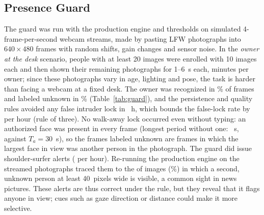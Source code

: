 \documentclass[journal]{IEEEtran}
\begin{document}
\subsection{Presence Guard}\label{sec:guardres}
The guard was run with the production engine and thresholds on simulated 4-frame-per-second webcam streams, made by pasting LFW photographs into $640\times480$ frames with random shifts, gain changes and sensor noise. In the \emph{owner at the desk} scenario, \gOwners{} people with at least 20 images were enrolled with 10 images each and then shown their remaining photographs for 1--6~s each, \gMinutes{} minutes per owner; since these photographs vary in age, lighting and pose, the task is harder than facing a webcam at a fixed desk. The owner was recognized in \gMatchFrac\% of frames and labeled unknown in \gUnknownFrac\% (Table~\ref{tab:guard}), and the persistence and quality rules avoided any false intruder lock in \gHours{}~h, which bounds the false-lock rate by \gLockBound{} per hour (rule of three). No walk-away lock occurred even without typing: an authorized face was present in every frame (longest period without one: \gLongestGap~s, against $T_a=30$~s), so the frames labeled unknown are frames in which the largest face in view was another person in the photograph. The guard did issue \gShldAlerts{} shoulder-surfer alerts (\gShldAlertsHour{} per hour). Re-running the production engine on the streamed photographs traced them to the \gdSecond{} of \gdPhotos{} images (\gdSecondPct\%) in which a second, unknown person at least 40~pixels wide is visible, a common sight in news pictures. These alerts are thus correct under the rule, but they reveal that it flags anyone in view; cues such as gaze direction or distance could make it more selective.
\end{document}
